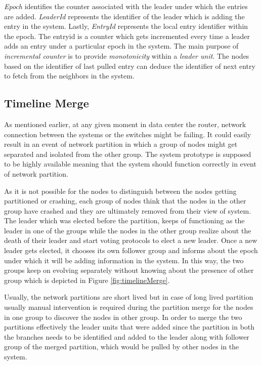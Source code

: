\documentclass[a4paper,11pt]{kth-mag}
\begin{document}
\textit{Epoch} identifies the counter associated with the leader under which the entries are added. \textit{LeaderId} represents the identifier of the leader which is adding the entry in the system. Lastly, \textit{EntryId} represents the local entry identifier within the epoch. The entryid is a counter which gets incremented every time a leader adds an entry under a particular epoch in the system. The main purpose of \textit{incremental counter} is to provide \textit{monotonicity} within a \textit{leader unit}. The nodes based on the identifier of last pulled entry can deduce the identifier of next entry to fetch from the neighbors in the system.


\subsection{Timeline Merge}

As mentioned earlier, at any given moment in data center the router, network connection between the systems or the switches might be failing. It could easily result in an event of network partition in which a group of nodes might get separated and isolated from the other group. The system prototype is supposed to be highly available meaning that the system should function correctly in event of network partition.

\par As it is not possible for the nodes to distinguish between the nodes getting partitioned or crashing, each group of nodes think that the nodes in the other group have crashed and they are ultimately removed from their view of system. The leader which was elected before the partition, keeps of functioning as the leader in one of the groups while the nodes in the other group realize about the death of their leader and start voting protocols to elect a new leader. Once a new leader gets elected, it chooses its own follower group and informs about the epoch under which it will be adding information in the system. In this way, the two groups keep on evolving separately without knowing about the presence of other group which is depicted in Figure \ref{fig:timelineMerge}.

\par Usually, the network partitions are short lived but in case of long lived partition usually manual intervention is required during the partition merge for the nodes in one group to discover the nodes in other group. In order to merge the two partitions effectively the leader units that were added since the partition in both the branches needs to be identified and added to the leader along with follower group of the merged partition, which would be pulled by other nodes in the system. 
\end{document}
